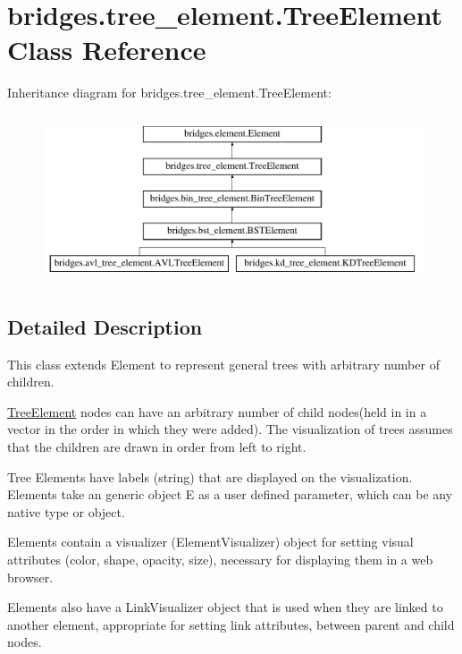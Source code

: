 \hypertarget{classbridges_1_1tree__element_1_1_tree_element}{}\section{bridges.\+tree\+\_\+element.\+Tree\+Element Class Reference}
\label{classbridges_1_1tree__element_1_1_tree_element}
Inheritance diagram for bridges.\+tree\+\_\+element.\+Tree\+Element\+:\begin{figure}[H]
\begin{center}
\leavevmode
\includegraphics[height=5.000000cm]{classbridges_1_1tree__element_1_1_tree_element}
\end{center}
\end{figure}


\subsection{Detailed Description}
This class extends Element to represent general trees with arbitrary number of children. 

\hyperlink{classbridges_1_1tree__element_1_1_tree_element}{Tree\+Element} nodes can have an arbitrary number of child nodes(held in in a vector in the order in which they were added). The visualization of trees assumes that the children are drawn in order from left to right.

Tree Elements have labels (string) that are displayed on the visualization. Elements take an generic object E as a user defined parameter, which can be any native type or object.

Elements contain a visualizer (Element\+Visualizer) object for setting visual attributes (color, shape, opacity, size), necessary for displaying them in a web browser.

Elements also have a Link\+Visualizer object that is used when they are linked to another element, appropriate for setting link attributes, between parent and child nodes.

